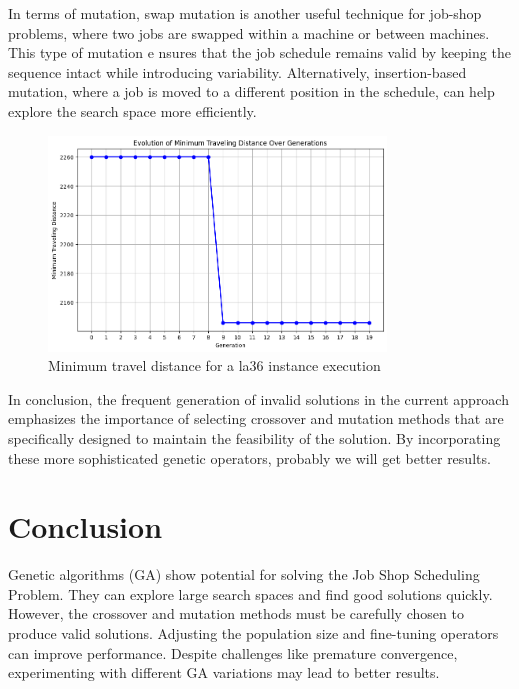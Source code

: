 \documentclass[11pt, a4paper]{article}
\begin{document}
\vspace{1em} In terms of mutation, swap mutation is another useful technique for job-shop problems, where two jobs are swapped within a machine or between machines. This type of mutation e
nsures that the job schedule remains valid by keeping the sequence intact while introducing variability. Alternatively, insertion-based mutation, where a job is moved to a different position 
in the schedule, can help explore the search space more efficiently.

\begin{figure}[H]
    \centering
    \includegraphics[width=0.8\textwidth]{media/minimum_travel_distance_la36.png}
    \caption{Minimum travel distance for a la36 instance execution}
    \label{fig:image_18}
\end{figure}

\vspace{1em} In conclusion, the frequent generation of invalid solutions in the current approach emphasizes the importance of selecting crossover and mutation methods that are specifically 
designed to maintain the feasibility of the solution. By incorporating these more sophisticated genetic operators, probably we will get better results.

\section{Conclusion}

Genetic algorithms (GA) show potential for solving the Job Shop Scheduling Problem. They can explore large search spaces and find good solutions quickly. However, the crossover and mutation 
methods must be carefully chosen to produce valid solutions. Adjusting the population size and fine-tuning operators can improve performance. Despite challenges like premature convergence, 
experimenting with different GA variations may lead to better results.
\end{document}

